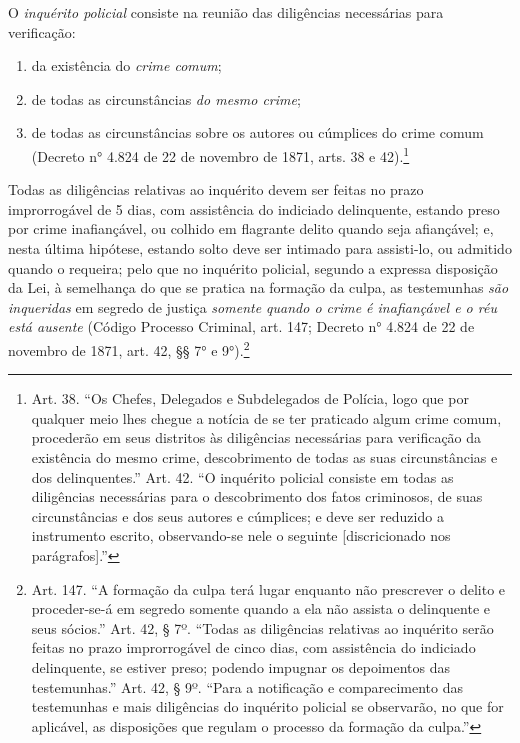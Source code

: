 O \emph{inquérito policial} consiste na reunião das diligências
necessárias para verificação:

\begin{enumerate}[label=\arabic*º]
\item da existência do \emph{crime comum};

\item de todas as circunstâncias \emph{do mesmo crime};

\item de todas as circunstâncias sobre os autores ou cúmplices do crime
comum (Decreto n° 4.824 de 22 de novembro de 1871, arts. 38 e
42).\footnote{Art. 38. ``Os Chefes, Delegados e Subdelegados de
  Polícia, logo que por qualquer meio lhes chegue a notícia de se ter
  praticado algum crime comum, procederão em seus distritos às
  diligências necessárias para verificação da existência do mesmo crime,
  descobrimento de todas as suas circunstâncias e dos delinquentes.''
  Art. 42. ``O inquérito policial consiste em todas as diligências
  necessárias para o descobrimento dos fatos criminosos, de suas
  circunstâncias e dos seus autores e cúmplices; e deve ser reduzido a
  instrumento escrito, observando-se nele o seguinte {[}discricionado
  nos parágrafos{]}.''}
\end{enumerate}

Todas as diligências relativas ao inquérito devem ser feitas no prazo
improrrogável de 5 dias, com assistência do indiciado delinquente,
estando preso por crime inafiançável, ou colhido em flagrante delito
quando seja afiançável; e, nesta última hipótese, estando solto deve ser
intimado para assisti-lo, ou admitido quando o requeira; pelo que no
inquérito policial, segundo a expressa disposição da Lei, à semelhança
do que se pratica na formação da culpa, as testemunhas \emph{são
inqueridas} em segredo de justiça \emph{somente quando o crime é
inafiançável e o réu está ausente} 
(Código Processo
Criminal, art. 147; Decreto n° 4.824 de 22 de novembro de
1871, art. 42, §§ 7° e 9°).\footnote{Art. 147. ``A formação da culpa
  terá lugar enquanto não prescrever o delito e proceder-se-á em segredo
  somente quando a ela não assista o delinquente e seus sócios.''
  Art. 42, § 7º. ``Todas as diligências relativas ao inquérito serão
  feitas no prazo improrrogável de cinco dias, com assistência do
  indiciado delinquente, se estiver preso; podendo impugnar os
  depoimentos das testemunhas.''
  Art. 42, § 9º. ``Para a notificação e comparecimento das testemunhas e
  mais diligências do inquérito policial se observarão, no que for
  aplicável, as disposições que regulam o processo da formação da
  culpa.''}

